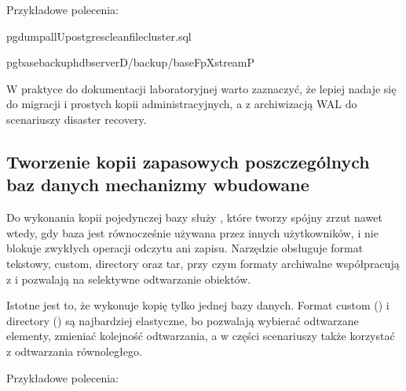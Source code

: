 \documentclass[a4paper,11pt,english,openany,oneside]{sphinxmanual}
\begin{document}
\sphinxAtStartPar
Przykładowe polecenia:

\begin{sphinxVerbatim}[commandchars=\\\{\}]
pg\PYGZus{}dumpall\PYGZhy{}Upostgres\PYGZhy{}\PYGZhy{}clean\PYGZhy{}\PYGZhy{}filecluster.sql

pg\PYGZus{}basebackup\PYGZhy{}hdbserver\PYGZhy{}D/backup/base\PYGZhy{}Fp\PYGZhy{}Xstream\PYGZhy{}P
\end{sphinxVerbatim}

\sphinxAtStartPar
W praktyce do dokumentacji laboratoryjnej warto zaznaczyć, że  lepiej nadaje się do migracji i prostych kopii administracyjnych, a  z archiwizacją WAL do scenariuszy disaster recovery.


\subsection{Tworzenie kopii zapasowych poszczególnych baz danych \sphinxhyphen{} mechanizmy wbudowane}
\label{\detokenize{rozdzial_2/rozdzial_28/index:tworzenie-kopii-zapasowych-poszczegolnych-baz-danych-mechanizmy-wbudowane}}
\sphinxAtStartPar
Do wykonania kopii pojedynczej bazy służy , które tworzy spójny zrzut nawet wtedy, gdy baza jest równocześnie używana przez innych użytkowników, i nie blokuje zwykłych operacji odczytu ani zapisu. Narzędzie obsługuje format tekstowy, custom, directory oraz tar, przy czym formaty archiwalne współpracują z  i pozwalają na selektywne odtwarzanie obiektów.

\sphinxAtStartPar
Istotne jest to, że  wykonuje kopię tylko jednej bazy danych. Format custom () i directory () są najbardziej elastyczne, bo pozwalają wybierać odtwarzane elementy, zmieniać kolejność odtwarzania, a w części scenariuszy także korzystać z odtwarzania równoległego.

\sphinxAtStartPar
Przykładowe polecenia:
\end{document}
